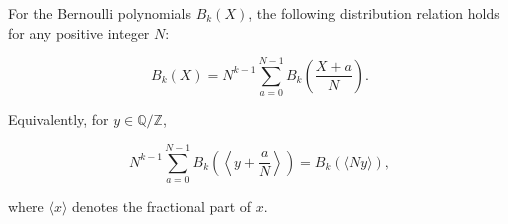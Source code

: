 For the Bernoulli polynomials $B_k(X)$, the following distribution relation holds for
any positive integer $N$:

$$B_k(X) = N^{k-1} \sum_{a=0}^{N-1} B_k\!\left(\frac{X + a}{N}\right).$$

Equivalently, for $y \in \mathbb{Q}/\mathbb{Z}$,

$$N^{k-1} \sum_{a=0}^{N-1} B_k\!\left(\left\langle y + \frac{a}{N} \right\rangle\right) = B_k(\langle N y \rangle),$$

where $\langle x \rangle$ denotes the fractional part of $x$.
